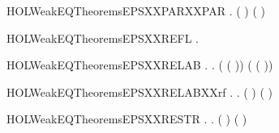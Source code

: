 \newcommand{\HOLWeakEQTheoremsEPSXXPAR}{\UseVerbatim{HOLWeakEQTheoremsEPSXXPAR}}
\begin{SaveVerbatim}{HOLWeakEQTheoremsEPSXXPARXXPAR}
\HOLTokenTurnstile{} \HOLSymConst{\HOLTokenForall{}}   .    \HOLSymConst{\HOLTokenConj{}}    \HOLSymConst{\HOLTokenImp{}}  ( \HOLSymConst{\ensuremath{\parallel}} ) ( \HOLSymConst{\ensuremath{\parallel}} )
\end{SaveVerbatim}
\newcommand{\HOLWeakEQTheoremsEPSXXPARXXPAR}{\UseVerbatim{HOLWeakEQTheoremsEPSXXPARXXPAR}}
\begin{SaveVerbatim}{HOLWeakEQTheoremsEPSXXREFL}
\HOLTokenTurnstile{} \HOLSymConst{\HOLTokenForall{}}.   
\end{SaveVerbatim}
\newcommand{\HOLWeakEQTheoremsEPSXXREFL}{\UseVerbatim{HOLWeakEQTheoremsEPSXXREFL}}
\begin{SaveVerbatim}{HOLWeakEQTheoremsEPSXXRELAB}
\HOLTokenTurnstile{} \HOLSymConst{\HOLTokenForall{}} .
          \HOLSymConst{\HOLTokenImp{}}
       \HOLSymConst{\HOLTokenForall{}}.  (  ( )) (  ( ))
\end{SaveVerbatim}
\newcommand{\HOLWeakEQTheoremsEPSXXRELAB}{\UseVerbatim{HOLWeakEQTheoremsEPSXXRELAB}}
\begin{SaveVerbatim}{HOLWeakEQTheoremsEPSXXRELABXXrf}
\HOLTokenTurnstile{} \HOLSymConst{\HOLTokenForall{}} .    \HOLSymConst{\HOLTokenImp{}} \HOLSymConst{\HOLTokenForall{}}.  (  ) (  )
\end{SaveVerbatim}
\newcommand{\HOLWeakEQTheoremsEPSXXRELABXXrf}{\UseVerbatim{HOLWeakEQTheoremsEPSXXRELABXXrf}}
\begin{SaveVerbatim}{HOLWeakEQTheoremsEPSXXRESTR}
\HOLTokenTurnstile{} \HOLSymConst{\HOLTokenForall{}} .    \HOLSymConst{\HOLTokenImp{}} \HOLSymConst{\HOLTokenForall{}}.  (\HOLConst{\ensuremath{\nu}}  ) (\HOLConst{\ensuremath{\nu}}  )
\end{SaveVerbatim}
